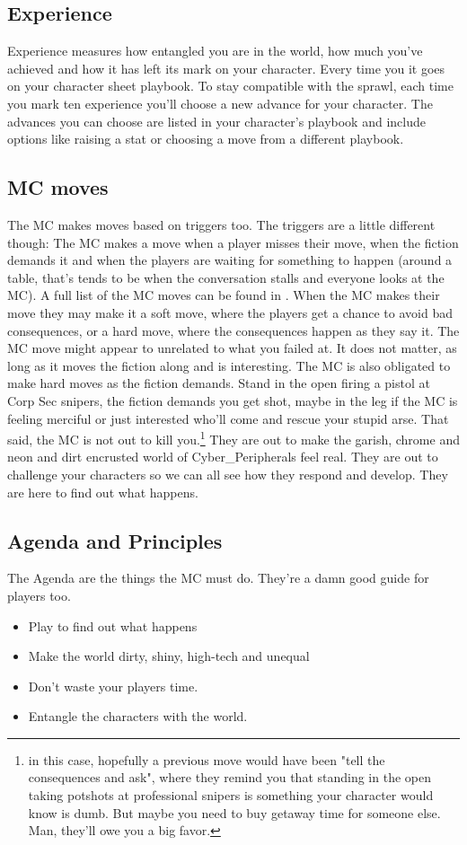 \documentclass{tufte-book}
\begin{document}
\subsection{Experience} \label{sec: experience}
Experience measures how entangled you are in the world, how much you've achieved and how it has left its mark on your character. Every time you  it goes on your character sheet playbook. To stay compatible with the sprawl, each time you mark ten experience you'll choose a new advance for your character. The advances you can choose are listed in your character's playbook and include options like raising a stat or choosing a move from a different playbook.

\subsection{MC moves} \label{sec: intro MC Moves}
The MC makes moves based on triggers too. The triggers are a little different though: The MC makes a move when a player misses their move, when the fiction demands it and when the players are waiting for something to happen (around a table, that's tends to be when the conversation stalls and everyone looks at the MC). A full list of the MC moves can be found in . When the MC makes their move they may make it a soft move, where the players get a chance to avoid bad consequences, or a hard move, where the consequences happen as they say it. The MC move might appear to unrelated to what you failed at. It does not matter, as long as it moves the fiction along and is interesting.
The MC is also obligated to make hard moves as the fiction demands. Stand in the open firing a pistol at Corp Sec snipers, the fiction demands you get shot, maybe in the leg if the MC is feeling merciful or just interested who'll come and rescue your stupid arse. That said, the MC is not out to kill you.\footnote{in this case, hopefully a previous move would have been "tell the consequences and ask", where they remind you that standing in the open taking potshots at professional snipers is something your character would know is dumb. But maybe you need to buy getaway time for someone else. Man, they'll owe you a big favor.} They are out to make the garish, chrome and neon and dirt encrusted world of Cyber\_Peripherals feel real. They are out to challenge your characters so we can all see how they respond and develop. They are here to find out what happens.

\subsection{Agenda and Principles} \label{sec: intro agenda and princ}
The Agenda are the things the MC must do. They're a damn good guide for players too.
\begin{itemize}
	\item Play to find out what happens
	\item Make the world dirty, shiny, high-tech and unequal
	\item Don't waste your players time.
	\item Entangle the characters with the world.
\end{itemize}
\end{document}
